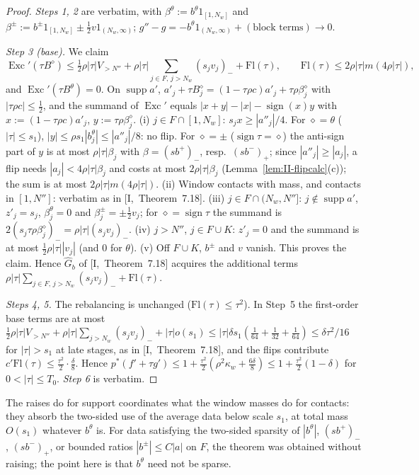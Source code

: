 \documentclass[10pt]{amsart}
\theoremstyle{definition}
\theoremstyle{remark}
\newcommand{\supp}{\operatorname{supp}}
\newcommand{\sgn}{\operatorname{sign}}
\newcommand{\Exc}{\operatorname{Exc}}
\begin{document}
\begin{proof}
\emph{Steps 1, 2} are verbatim, with $\beta^\theta:=b^\theta1_{[1,N_w]}$ and
$\beta^\pm:=b^\pm1_{[1,N_w]}\pm\frac12v1_{(N_w,\infty)}$;
$g''-g=-b^\theta1_{(N_w,\infty)}+(\text{block terms})\to0$.

\emph{Step 3 (base).}  We claim
\[
 \Exc'(\tau B^\diamond)\le\tfrac12\rho|\tau|V_{>N''}+\rho|\tau|\sum_{j\in
 F,\,j>N_w}(s_jv_j)_-+\mathrm{Fl}(\tau),\qquad\mathrm{Fl}(\tau)\le2\rho|\tau|
 m(4\rho|\tau|),
\]
and $\Exc'(\tau B^\theta)=0$.  On $\supp a'$, $a'_j+\tau B^\diamond_j=
(1-\tau\rho c)a'_j+\tau\rho\beta^\diamond_j$ with $|\tau\rho c|\le\frac12$, and
the summand of $\Exc'$ equals $|x+y|-|x|-\sgn(x)y$ with $x:=(1-\tau\rho
c)a'_j$, $y:=\tau\rho\beta^\diamond_j$.
(i) $j\in F\cap[1,N_w]$: $s_jx\ge|a''_j|/4$.  For $\diamond=\theta$
($|\tau|\le s_1$), $|y|\le\rho s_1|b^\theta_j|\le|a''_j|/8$: no flip.  For
$\diamond=\pm$ ($\sgn\tau=\diamond$) the anti-sign part of $y$ is at most
$\rho|\tau|\beta_j$ with $\beta=(sb^+)_-$, resp.\ $(sb^-)_+$; since
$|a''_j|\ge|a_j|$, a flip needs $|a_j|<4\rho|\tau|\beta_j$ and costs at most
$2\rho|\tau|\beta_j$ (Lemma~\ref{lem:II-flipcalc}(c)); the sum is at most
$2\rho|\tau|m(4\rho|\tau|)$.
(ii) Window contacts with mass, and contacts in $[1,N'']$: verbatim as in
[I,~Theorem~7.18].
(iii) $j\in F\cap(N_w,N'']$: $j\notin\supp a'$, $z'_j=s_j$, $\beta^\theta_j=0$
and $\beta^\pm_j=\pm\frac12v_j$; for $\diamond=\sgn\tau$ the summand is
$2(s_j\tau\rho\beta^\diamond_j)_-=\rho|\tau|(s_jv_j)_-$.
(iv) $j>N''$, $j\in F\cup K$: $z'_j=0$ and the summand is at most
$\frac12\rho|\tau||v_j|$ (and $0$ for $\theta$).
(v) Off $F\cup K$, $b^\pm$ and $v$ vanish.
This proves the claim.  Hence $\hat G_b$ of [I,~Theorem~7.18] acquires the
additional terms $\rho|\tau|\sum_{j\in F,\,j>N_w}(s_jv_j)_-+\mathrm{Fl}(\tau)$.

\emph{Steps 4, 5.}  The rebalancing is unchanged ($\mathrm{Fl}(\tau)\le
\tau^2$).  In Step~5 the first-order base terms are at most
$\frac12\rho|\tau|V_{>N''}+\rho|\tau|\sum_{j>N_w}(s_jv_j)_-+|\tau|o(s_1)\le
|\tau|\delta s_1(\frac1{64}+\frac1{32}+\frac1{64})\le\delta\tau^2/16$ for
$|\tau|>s_1$ at late stages, as in [I,~Theorem~7.18], and the flips
contribute $c'\mathrm{Fl}(\tau)\le\frac{\tau^2}2\cdot\frac\delta8$.  Hence
$p^*(f'+\tau g')\le1+\frac{\tau^2}2(\rho^2\kappa_w+\frac{6\delta}8)\le1+
\frac{\tau^2}2(1-\delta)$ for $0<|\tau|\le T_0$.  \emph{Step 6} is verbatim.
\end{proof}

The raises do for support coordinates what the window masses do for
contacts: they absorb the two-sided use of the average data below scale
$s_1$, at total mass $O(s_1)$ whatever $b^\theta$ is.  For data satisfying
the two-sided sparsity of $|b^\theta|$, $(sb^+)_-$, $(sb^-)_+$, or bounded
ratios $|b^\pm|\le C|a|$ on $F$, the theorem was obtained without raising;
the point here is that $b^\theta$ need not be sparse.
\end{document}
